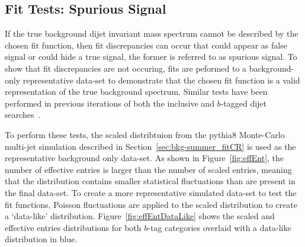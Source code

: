 \subsection{Fit Tests: Spurious Signal}
\label{sec:bkg-summer_spusig}

If the true background dijet invariant mass spectrum cannot be described by the chosen fit function,
then fit discrepancies can occur that could appear as false signal or could hide a true signal,
the former is referred to as spurious signal.
To show that fit discrepancies are not occuring, fits are peformed to a background-only representative data-set
to demonstrate that the chosen fit function is a valid representation of the true background spectrum.
Similar tests have been performed in previous iterations of both the inclusive and $b$-tagged dijet searches~\cite{dijet-mori16_paper,dibjet-mori16_paper}.

To perform these tests, the scaled distribtuion from the {\sc pythia}8 Monte-Carlo multi-jet simulation
described in Section~\ref{sec:bkg-summer_fitCR}
is used as the representative background only data-set.
As shown in Figure~\ref{fig:effEnt},
the number of effective entries is larger than the number of scaled entries,
meaning that the distribution contains smaller statistical fluctuations than are present in the final data-set.
To create a more representative simulated data-set to test the fit functions,
Poisson fluctuations are applied to the scaled distribution to create a `data-like' distribution.
Figure~\ref{fig:effEntDataLike} shows the scaled and effective entries distributions for both
$b$-tag categories overlaid with a data-like distribution in blue.

